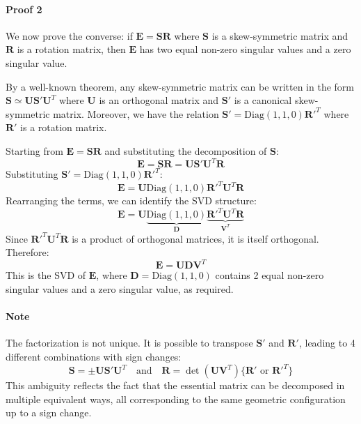 \documentclass[11pt,a4paper]{article}
\theoremstyle{definition}
\theoremstyle{plain}
\theoremstyle{remark}
\begin{document}
\paragraph{Proof 2}
We now prove the converse: if $\mathbf{E} = \mathbf{S} \mathbf{R}$ where $\mathbf{S}$ is a skew-symmetric matrix and $\mathbf{R}$ is a rotation matrix, then $\mathbf{E}$ has two equal non-zero singular values and a zero singular value.

By a well-known theorem, any skew-symmetric matrix can be written in the form $\mathbf{S} \simeq \mathbf{U} \mathbf{S'} \mathbf{U}^T$ where $\mathbf{U}$ is an orthogonal matrix and $\mathbf{S'}$ is a canonical skew-symmetric matrix. Moreover, we have the relation $\mathbf{S'} = \text{Diag}(1,1,0) \mathbf{R'}^T$ where $\mathbf{R'}$ is a rotation matrix.

Starting from $\mathbf{E} = \mathbf{S} \mathbf{R}$ and substituting the decomposition of $\mathbf{S}$:
\begin{equation} \nonumber
    \mathbf{E} = \mathbf{S} \mathbf{R} = \mathbf{U} \mathbf{S'} \mathbf{U}^T \mathbf{R}
\end{equation}
Substituting $\mathbf{S'} = \text{Diag}(1,1,0) \mathbf{R'}^T$:
\begin{equation} \nonumber
    \mathbf{E} = \mathbf{U} \text{Diag}(1,1,0) \mathbf{R'}^T \mathbf{U}^T \mathbf{R}
\end{equation}
Rearranging the terms, we can identify the SVD structure:
\begin{equation} \nonumber
    \mathbf{E} = \mathbf{U} \underbrace{\text{Diag}(1,1,0)}_{\mathbf{D}} \underbrace{\mathbf{R'}^T \mathbf{U}^T \mathbf{R}}_{\mathbf{V}^T}
\end{equation}
Since $\mathbf{R'}^T \mathbf{U}^T \mathbf{R}$ is a product of orthogonal matrices, it is itself orthogonal. Therefore:
\begin{equation} \label{eq:E_SVD_from_SR}
    \mathbf{E} = \mathbf{U} \mathbf{D} \mathbf{V}^T
\end{equation}
This is the SVD of $\mathbf{E}$, where $\mathbf{D} = \text{Diag}(1,1,0)$ contains 2 equal non-zero singular values and a zero singular value, as required.

\paragraph{Note}
The factorization is not unique. It is possible to transpose $\mathbf{S'}$ and $\mathbf{R'}$, leading to 4 different combinations with sign changes:
\begin{equation} \nonumber
    \mathbf{S} = \pm \mathbf{U} \mathbf{S'} \mathbf{U}^T \quad \text{and} \quad \mathbf{R} = \det(\mathbf{U} \mathbf{V}^T) \{\mathbf{R'} \text{ or } \mathbf{R'}^T\}
\end{equation}
This ambiguity reflects the fact that the essential matrix can be decomposed in multiple equivalent ways, all corresponding to the same geometric configuration up to a sign change.
\end{document}
